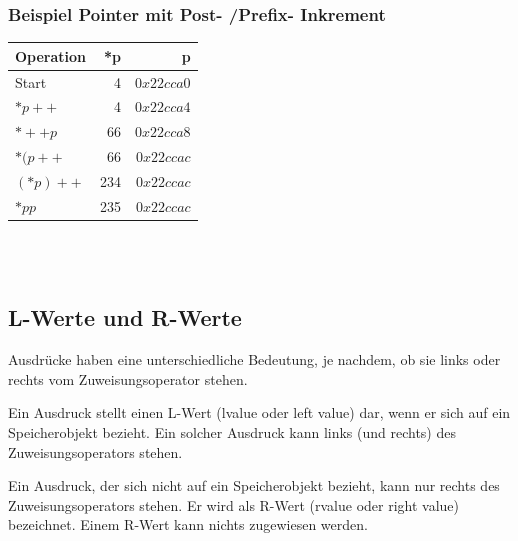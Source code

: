 			\hspace*{0.5cm}
			\begin{minipage}[t]{8 cm}
				\subsubsection{Beispiel Pointer mit Post- /Prefix- Inkrement}
					
					\begin{tabular}{|l|r|r|}
					  \hline
					  Operation &  *p & p \\
					  \hline
					  Start & 4 & $0x22cca0$ \\
					  $*p++$ & 4 & $0x22cca4$ \\
					  $*++p$ & 66 & $0x22cca8$ \\
					  $*(p++$ & 66 & $0x22ccac$ \\
					  $(*p)++$ & 234 & $0x22ccac$ \\
					  $*pp$ & 235 & $0x22ccac$ \\
					  \hline
					\end{tabular}
			\end{minipage}\\\\
				\begin{minipage}[t]{13 cm}
				\subsection{L-Werte und R-Werte}
					\begin{compactitem}
						\item Ausdrücke haben eine unterschiedliche Bedeutung, je nachdem, ob sie links oder rechts vom Zuweisungsoperator stehen.
						\item Ein Ausdruck stellt einen L-Wert (lvalue oder left value) dar, wenn er
						sich auf ein Speicherobjekt bezieht. Ein solcher Ausdruck kann links (und rechts) des Zuweisungsoperators stehen.
						\item Ein Ausdruck, der sich nicht auf ein Speicherobjekt bezieht, kann nur
						rechts des Zuweisungsoperators stehen. Er wird als R-Wert (rvalue oder right value) bezeichnet. Einem R-Wert kann nichts zugewiesen werden.\\
						
					\end{compactitem}
				\end{minipage}
				\hspace*{1cm}
